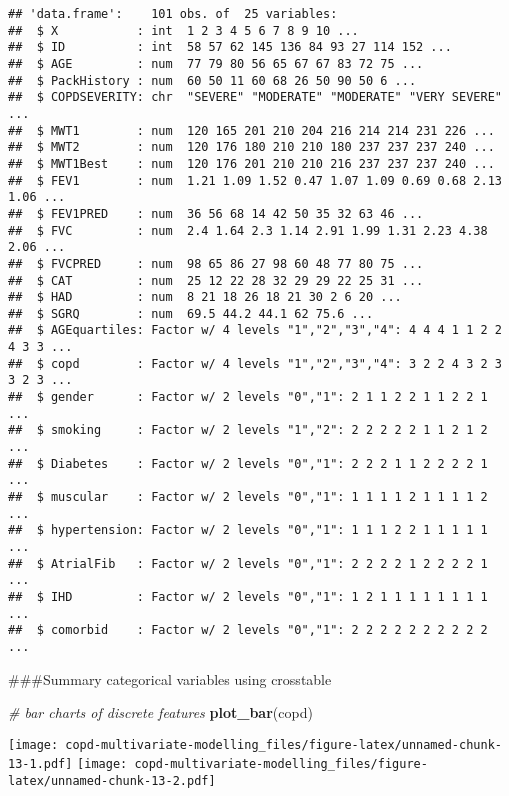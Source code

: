 \documentclass[
]{article}
\newenvironment{Shaded}{\begin{snugshade}}{\end{snugshade}}
\newcommand{\CommentTok}[1]{\textcolor[rgb]{0.56,0.35,0.01}{\textit{#1}}}
\newcommand{\FunctionTok}[1]{\textcolor[rgb]{0.13,0.29,0.53}{\textbf{#1}}}
\newcommand{\NormalTok}[1]{#1}
\begin{document}
\begin{verbatim}
## 'data.frame':    101 obs. of  25 variables:
##  $ X           : int  1 2 3 4 5 6 7 8 9 10 ...
##  $ ID          : int  58 57 62 145 136 84 93 27 114 152 ...
##  $ AGE         : num  77 79 80 56 65 67 67 83 72 75 ...
##  $ PackHistory : num  60 50 11 60 68 26 50 90 50 6 ...
##  $ COPDSEVERITY: chr  "SEVERE" "MODERATE" "MODERATE" "VERY SEVERE" ...
##  $ MWT1        : num  120 165 201 210 204 216 214 214 231 226 ...
##  $ MWT2        : num  120 176 180 210 210 180 237 237 237 240 ...
##  $ MWT1Best    : num  120 176 201 210 210 216 237 237 237 240 ...
##  $ FEV1        : num  1.21 1.09 1.52 0.47 1.07 1.09 0.69 0.68 2.13 1.06 ...
##  $ FEV1PRED    : num  36 56 68 14 42 50 35 32 63 46 ...
##  $ FVC         : num  2.4 1.64 2.3 1.14 2.91 1.99 1.31 2.23 4.38 2.06 ...
##  $ FVCPRED     : num  98 65 86 27 98 60 48 77 80 75 ...
##  $ CAT         : num  25 12 22 28 32 29 29 22 25 31 ...
##  $ HAD         : num  8 21 18 26 18 21 30 2 6 20 ...
##  $ SGRQ        : num  69.5 44.2 44.1 62 75.6 ...
##  $ AGEquartiles: Factor w/ 4 levels "1","2","3","4": 4 4 4 1 1 2 2 4 3 3 ...
##  $ copd        : Factor w/ 4 levels "1","2","3","4": 3 2 2 4 3 2 3 3 2 3 ...
##  $ gender      : Factor w/ 2 levels "0","1": 2 1 1 2 2 1 1 2 2 1 ...
##  $ smoking     : Factor w/ 2 levels "1","2": 2 2 2 2 2 1 1 2 1 2 ...
##  $ Diabetes    : Factor w/ 2 levels "0","1": 2 2 2 1 1 2 2 2 2 1 ...
##  $ muscular    : Factor w/ 2 levels "0","1": 1 1 1 1 2 1 1 1 1 2 ...
##  $ hypertension: Factor w/ 2 levels "0","1": 1 1 1 2 2 1 1 1 1 1 ...
##  $ AtrialFib   : Factor w/ 2 levels "0","1": 2 2 2 2 1 2 2 2 2 1 ...
##  $ IHD         : Factor w/ 2 levels "0","1": 1 2 1 1 1 1 1 1 1 1 ...
##  $ comorbid    : Factor w/ 2 levels "0","1": 2 2 2 2 2 2 2 2 2 2 ...
\end{verbatim}

\#\#\#Summary categorical variables using crosstable

\begin{Shaded}
\begin{Highlighting}[]
\CommentTok{\# bar charts of discrete features}
\FunctionTok{plot\_bar}\NormalTok{(copd)}
\end{Highlighting}
\end{Shaded}

\texttt{[image: copd-multivariate-modelling\_files/figure-latex/unnamed-chunk-13-1.pdf]}
\texttt{[image: copd-multivariate-modelling\_files/figure-latex/unnamed-chunk-13-2.pdf]}
\end{document}
